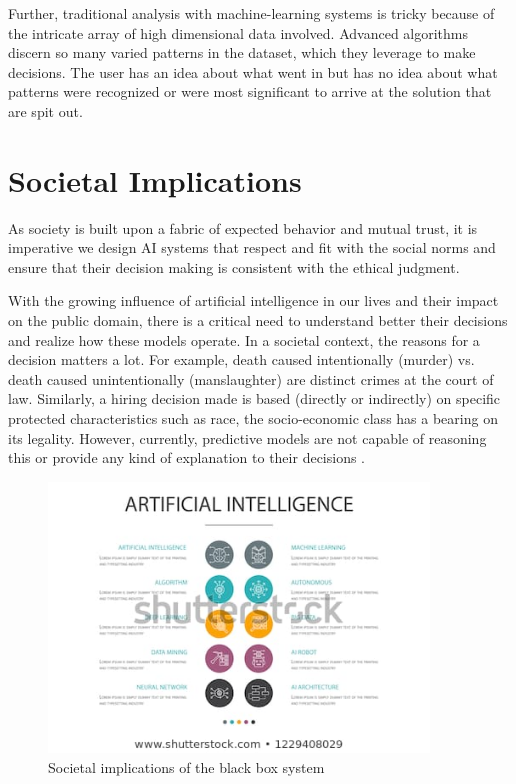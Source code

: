Further, traditional analysis with machine-learning systems is tricky because of the intricate array of high dimensional data involved. Advanced algorithms discern so many varied patterns in the dataset, which they leverage to make decisions. The user has an idea about what went in but has no idea about what patterns were recognized or were most significant to arrive at the solution that are spit out.

\section{Societal Implications}

As society is built upon a fabric of expected behavior and mutual trust, it is imperative we design AI systems that respect and fit with the social norms and ensure that their decision making is consistent with the ethical judgment. 

With the growing influence of artificial intelligence in our lives and their impact on the public domain, there is a critical need to understand better their decisions and realize how these models operate.  In a societal context, the reasons for a decision matters a lot. For example, death caused intentionally (murder) vs. death caused unintentionally (manslaughter) are distinct crimes at the court of law. Similarly, a hiring decision made is based (directly or indirectly) on specific protected characteristics such as race, the socio-economic class has a bearing on its legality. However, currently, predictive models are not capable of reasoning this or provide any kind of explanation to their decisions \cite{molnar}.

\begin{figure}[htbp]
\centering
\includegraphics[width=0.9\textwidth]{images/societal-impact-1.jpg}
\caption{Societal implications of the black box system}
\label{fig:societal-impacts}
\end{figure}

